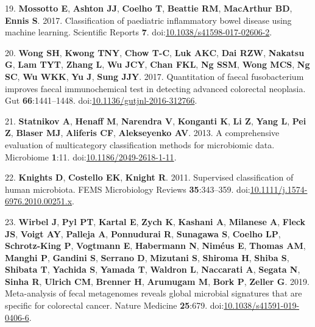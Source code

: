 \documentclass[
  11pt,
]{article}
\begin{document}
\leavevmode\hypertarget{ref-mossotto_classification_2017}{}%
19. \textbf{Mossotto E}, \textbf{Ashton JJ}, \textbf{Coelho T},
\textbf{Beattie RM}, \textbf{MacArthur BD}, \textbf{Ennis S}. 2017.
Classification of paediatric inflammatory bowel disease using machine
learning. Scientific Reports \textbf{7}.
doi:\href{https://doi.org/10.1038/s41598-017-02606-2}{10.1038/s41598-017-02606-2}.

\leavevmode\hypertarget{ref-wong_quantitation_2017}{}%
20. \textbf{Wong SH}, \textbf{Kwong TNY}, \textbf{Chow T-C}, \textbf{Luk
AKC}, \textbf{Dai RZW}, \textbf{Nakatsu G}, \textbf{Lam TYT},
\textbf{Zhang L}, \textbf{Wu JCY}, \textbf{Chan FKL}, \textbf{Ng SSM},
\textbf{Wong MCS}, \textbf{Ng SC}, \textbf{Wu WKK}, \textbf{Yu J},
\textbf{Sung JJY}. 2017. Quantitation of faecal fusobacterium improves
faecal immunochemical test in detecting advanced colorectal neoplasia.
Gut \textbf{66}:1441--1448.
doi:\href{https://doi.org/10.1136/gutjnl-2016-312766}{10.1136/gutjnl-2016-312766}.

\leavevmode\hypertarget{ref-statnikov_comprehensive_2013}{}%
21. \textbf{Statnikov A}, \textbf{Henaff M}, \textbf{Narendra V},
\textbf{Konganti K}, \textbf{Li Z}, \textbf{Yang L}, \textbf{Pei Z},
\textbf{Blaser MJ}, \textbf{Aliferis CF}, \textbf{Alekseyenko AV}. 2013.
A comprehensive evaluation of multicategory classification methods for
microbiomic data. Microbiome \textbf{1}:11.
doi:\href{https://doi.org/10.1186/2049-2618-1-11}{10.1186/2049-2618-1-11}.

\leavevmode\hypertarget{ref-knights_supervised_2011}{}%
22. \textbf{Knights D}, \textbf{Costello EK}, \textbf{Knight R}. 2011.
Supervised classification of human microbiota. FEMS Microbiology Reviews
\textbf{35}:343--359.
doi:\href{https://doi.org/10.1111/j.1574-6976.2010.00251.x}{10.1111/j.1574-6976.2010.00251.x}.

\leavevmode\hypertarget{ref-wirbel_meta-analysis_2019}{}%
23. \textbf{Wirbel J}, \textbf{Pyl PT}, \textbf{Kartal E}, \textbf{Zych
K}, \textbf{Kashani A}, \textbf{Milanese A}, \textbf{Fleck JS},
\textbf{Voigt AY}, \textbf{Palleja A}, \textbf{Ponnudurai R},
\textbf{Sunagawa S}, \textbf{Coelho LP}, \textbf{Schrotz-King P},
\textbf{Vogtmann E}, \textbf{Habermann N}, \textbf{Niméus E},
\textbf{Thomas AM}, \textbf{Manghi P}, \textbf{Gandini S},
\textbf{Serrano D}, \textbf{Mizutani S}, \textbf{Shiroma H},
\textbf{Shiba S}, \textbf{Shibata T}, \textbf{Yachida S}, \textbf{Yamada
T}, \textbf{Waldron L}, \textbf{Naccarati A}, \textbf{Segata N},
\textbf{Sinha R}, \textbf{Ulrich CM}, \textbf{Brenner H},
\textbf{Arumugam M}, \textbf{Bork P}, \textbf{Zeller G}. 2019.
Meta-analysis of fecal metagenomes reveals global microbial signatures
that are specific for colorectal cancer. Nature Medicine
\textbf{25}:679.
doi:\href{https://doi.org/10.1038/s41591-019-0406-6}{10.1038/s41591-019-0406-6}.
\end{document}
